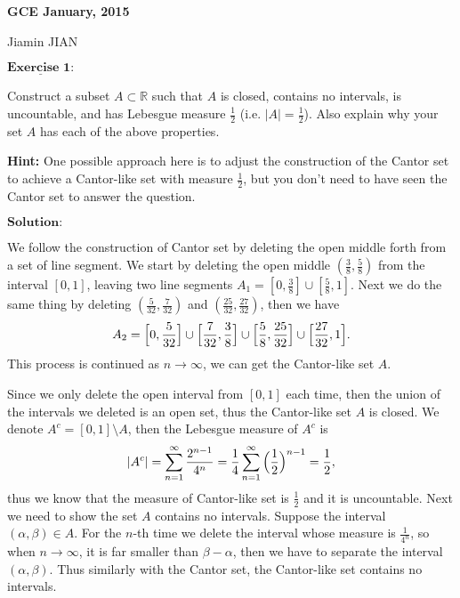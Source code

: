\documentclass[12pt,a4paper]{ctexart}
\begin{document}
\begin{center}
\textbf{ GCE January, 2015}
\vspace{8pt}

Jiamin JIAN
\end{center}

\vspace{12pt}

$\underline{\textbf{Exercise 1:}}$

Construct a subset $A \subset \mathbb{R}$ such that $A$ is closed, contains no intervals, is uncountable, and has Lebesgue measure $\frac{1}{2}$ (i.e. $|A| = \frac{1}{2}$). Also explain why your set $A$ has each of the above properties.

\textbf{Hint:} One possible approach here is to adjust the construction of the Cantor set to achieve a Cantor-like set with measure $\frac{1}{2}$, but you don't need to have seen the Cantor set to answer the question.

\vspace{8pt}

$\textbf{Solution:}$

We follow the construction of Cantor set by deleting the open middle forth from a set of line segment. We start by deleting the open middle $(\frac{3}{8}, \frac{5}{8})$ from the interval $[0, 1]$, leaving two line segments $A_{1} = [0, \frac{3}{8}] \cup [\frac{5}{8}, 1]$. Next we do the same thing by deleting $(\frac{5}{32}, \frac{7}{32})$ and $(\frac{25}{32}, \frac{27}{32})$, then we have
\begin{equation*}
    A_{2} = \Big{[} 0, \frac{5}{32} \Big{]} \cup \Big{[} \frac{7}{32}, \frac{3}{8} \Big{]} \cup \Big{[} \frac{5}{8}, \frac{25}{32} \Big{]} \cup \Big{[} \frac{27}{32}, 1 \Big{]}.
\end{equation*}
This process is continued as $n \to \infty$, we can get the Cantor-like set $A$.

Since we only delete the open interval from $[0, 1]$ each time, then the union of the intervals we deleted is an open set, thus the Cantor-like set $A$ is closed. We denote $A^{c} = [0, 1] \setminus A$, then the Lebesgue measure of $A^c$ is
\begin{equation*}
    |A^{c}| = \sum_{n = 1}^{\infty} \frac{2^{n-1}}{4^{n}} = \frac{1}{4}  \sum_{n = 1}^{\infty} \Big{(} \frac{1}{2} \Big{)}^{n -1} = \frac{1}{2},
\end{equation*}
thus we know that the measure of Cantor-like set is $\frac{1}{2}$ and it is uncountable. Next we need to show the set $A$ contains no intervals. Suppose the interval $(\alpha, \beta) \in A$. For the $n$-th time we delete the interval whose measure is $\frac{1}{4^{n}}$, so when $n \to \infty$, it is far smaller than $\beta - \alpha$, then we have to separate the interval $(\alpha, \beta)$. Thus similarly with the Cantor set, the Cantor-like set contains no intervals.
\end{document}
